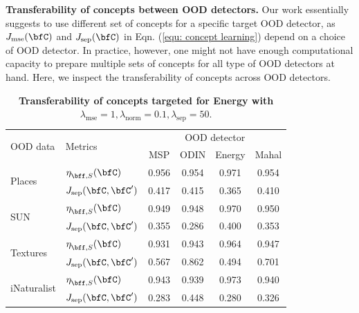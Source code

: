\textbf{Transferability of concepts between OOD detectors.}
Our work essentially suggests to use different set of concepts for a specific target OOD detector, as $J_{\textrm{mse}}(\bfC)$ and $J_{\textrm{sep}}(\bfC)$ in Eqn. (\ref{equ: concept learning}) depend on a choice of OOD detector. 
In practice, however, one might not have enough computational capacity to prepare multiple sets of concepts for all type of OOD detectors at hand.
Here, we inspect the transferability of concepts across OOD detectors.
\begin{table}[htb]
    \small
    \centering
    \begin{adjustbox}{}
		\begin{tabular}{l|l|c|c|c|c}
			\toprule
			\multirow{2}{0.14\linewidth}{OOD data} & \multirow{2}{0.06\linewidth}{Metrics} & \multicolumn{4}{c}{OOD detector} \\ \cline{3-6}
    		& & MSP & ODIN & Energy & Mahal\\  \hline \hline
			\multirow{2}{0.08\linewidth}{Places} & $\eta^{}_{\bff, S}(\bfC)$ &0.956& 0.954 &0.971 & 0.954\\ 
			& $J_{\textrm{sep}}(\bfC, \bfC')$ & 0.417 & 0.415 &0.365& 0.410 \\\hline 
            \multirow{2}{0.08\linewidth}{SUN} & $\eta^{}_{\bff, S}(\bfC)$ &0.949& 0.948 &0.970& 0.950\\ 
			& $J_{\textrm{sep}}(\bfC, \bfC')$ & 0.355 &0.286 &0.400& 0.353 \\\hline 
			\multirow{2}{0.08\linewidth}{Textures} & $\eta^{}_{\bff, S}(\bfC)$ &0.931& 0.943 &0.964& 0.947\\ 
			& $J_{\textrm{sep}}(\bfC, \bfC')$ & 0.567 & 0.862&0.494&0.701 \\\hline 
			\multirow{2}{0.08\linewidth}{iNaturalist} & $\eta^{}_{\bff, S}(\bfC)$ &0.943& 0.939 &0.973& 0.940\\ 
			& $J_{\textrm{sep}}(\bfC, \bfC')$ & 0.283 &0.448 &0.280& 0.326\\
 \bottomrule
		\end{tabular}
	\end{adjustbox}
	\caption[]{\small \textbf{Transferability of concepts targeted for Energy with $\lambda_\textrm{mse} = 1, \lambda_\textrm{norm} = 0.1, \lambda_\textrm{sep} = 50$}.}
	\label{tab:transferability-energy}
\end{table}
